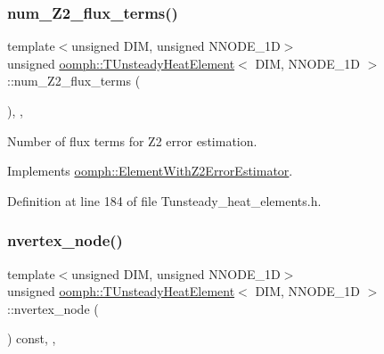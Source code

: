 \subsubsection{\texorpdfstring{num\+\_\+\+Z2\+\_\+flux\+\_\+terms()}{num\_Z2\_flux\_terms()}}
{\footnotesize\ttfamily template$<$unsigned D\+IM, unsigned N\+N\+O\+D\+E\+\_\+1D$>$ \\
unsigned \hyperlink{classoomph_1_1TUnsteadyHeatElement}{oomph\+::\+T\+Unsteady\+Heat\+Element}$<$ D\+IM, N\+N\+O\+D\+E\+\_\+1D $>$\+::num\+\_\+\+Z2\+\_\+flux\+\_\+terms (\begin{DoxyParamCaption}{ }\end{DoxyParamCaption})\hspace{0.3cm}{\ttfamily [inline]}, {\ttfamily [protected]}, {\ttfamily [virtual]}}



Number of \textquotesingle{}flux\textquotesingle{} terms for Z2 error estimation. 



Implements \hyperlink{classoomph_1_1ElementWithZ2ErrorEstimator_ae82c5728902e13da31be19c390fc28e3}{oomph\+::\+Element\+With\+Z2\+Error\+Estimator}.



Definition at line 184 of file Tunsteady\+\_\+heat\+\_\+elements.\+h.

\mbox{\label{classoomph_1_1TUnsteadyHeatElement_a8fb6b9483f1e78e21144e1443a6f0f4d}} 
\subsubsection{\texorpdfstring{nvertex\+\_\+node()}{nvertex\_node()}}
{\footnotesize\ttfamily template$<$unsigned D\+IM, unsigned N\+N\+O\+D\+E\+\_\+1D$>$ \\
unsigned \hyperlink{classoomph_1_1TUnsteadyHeatElement}{oomph\+::\+T\+Unsteady\+Heat\+Element}$<$ D\+IM, N\+N\+O\+D\+E\+\_\+1D $>$\+::nvertex\+\_\+node (\begin{DoxyParamCaption}{ }\end{DoxyParamCaption}) const\hspace{0.3cm}{\ttfamily [inline]}, {\ttfamily [protected]}, {\ttfamily [virtual]}}



